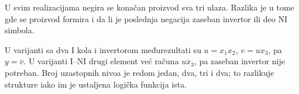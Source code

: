 
U svim realizacijama negira se konačan proizvod sva tri ulaza. Razlika je u tome gde se proizvod formira i da li je poslednja negacija zaseban invertor ili deo NI simbola.

U varijanti sa dva I kola i invertorom međurezultati su \(u=x_1x_2\), \(v=ux_3\), pa \(y=\bar{v}\). U varijanti I--NI drugi element već računa \(\overline{ux_3}\), pa zaseban invertor nije potreban. Broj uzastopnih nivoa je redom jedan, dva, tri i dva; to razlikuje strukture iako im je ustaljena logička funkcija ista.
